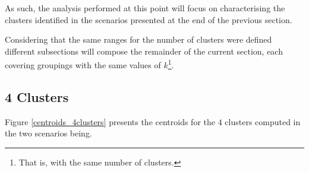 \documentclass[9pt,journal,compsoc]{IEEEtran}
\begin{document}
As such, the analysis performed at this point will focus on characterising the clusters identified in the scenarios presented at the end of the previous section.

Considering that the same ranges for the number of clusters were defined different subsections will compose the remainder of the current section, each covering groupings with the same values of $k$\footnote{That is, with the same number of clusters.}.

\subsection{4 Clusters}

Figure \ref{centroids_4clusters} presents the centroids for the $4$ clusters computed in the two scenarios being.
\end{document}
